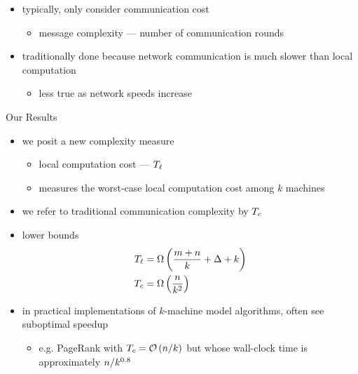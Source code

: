 \begin{frame}
    \begin{itemize}
        \item typically, \alert{only consider communication cost}
              \begin{itemize}
                  \item message complexity --- number of communication rounds
              \end{itemize}
        \item traditionally done because network communication is much slower
              than local computation
              \begin{itemize}
                  \item less true as network speeds increase
              \end{itemize}
    \end{itemize}
\end{frame}


\begin{frame}{Our Results}
    \begin{itemize}
        \item we posit a new complexity measure
              \begin{itemize}
                  \item \alert{local computation cost} --- $T_{\ell}$
                  \item measures the worst-case local computation cost among $k$ machines
              \end{itemize}
        \item we refer to traditional communication complexity by $T_c$
        \item lower bounds
              \begin{align*}
                  T_{\ell} & = \Omega\left(\frac{m + n}{k} + \Delta + k\right) \\
                  T_c & = \Omega\left(\frac{n}{k^2}\right)
              \end{align*}
        \item in practical implementations of $k$-machine model algorithms,
              often see suboptimal speedup
              \begin{itemize}
                  \item e.g. PageRank with $T_c = \mathcal{O}\left(n / k\right)$ but whose wall-clock
                        time is approximately $n / k^{0.8}$
              \end{itemize}
    \end{itemize}
\end{frame}

